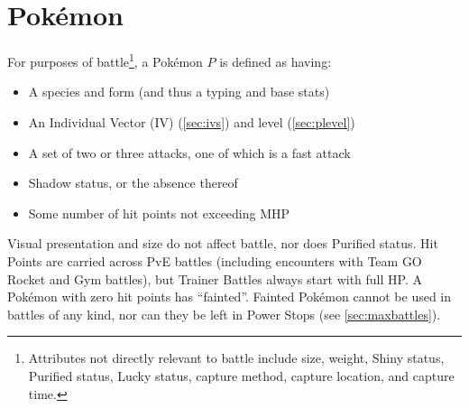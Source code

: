 \chapter{Pokémon}
\label{chap:pokemon}
For purposes of battle\footnote{Attributes not directly relevant to battle include size, weight, Shiny status,
Purified status, Lucky status, capture method, capture location, and capture time.}, a Pokémon $P$ is defined as having:
\begin{itemize}
\item A species and form (and thus a typing and base stats)
\item An Individual Vector (IV) (\autoref{sec:ivs}) and level (\autoref{sec:plevel})
\item A set of two or three attacks, one of which is a fast attack
\item Shadow status, or the absence thereof
\item Some number of hit points not exceeding MHP
\end{itemize}
Visual presentation and size do not affect battle, nor does Purified status.
Hit Points are carried across PvE battles (including encounters with
  Team GO Rocket and Gym battles), but Trainer Battles always start with full HP\@.
A Pokémon with zero hit points has ``fainted''.
Fainted Pokémon cannot be used in battles of any kind, nor can they be left in
 Power Stops (see \autoref{sec:maxbattles}).


